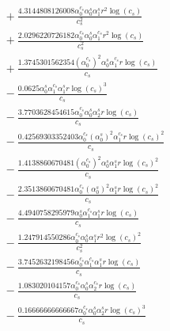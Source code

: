 \documentclass[10pt]{article}
\begin{document}
\begin{align*}
&{}  + \frac{4.3144808126008 \alpha_{0}^{c_s} \alpha_{0}^s \alpha_{1}^s r^{2} \log{\left(c_{s} \right)}}{c_{s}^{2}} \\
&{}  + \frac{2.0296220726182 \alpha_{0}^{c_s} \alpha_{0}^s \alpha_{1}^{c_s} r^{2} \log{\left(c_{s} \right)}}{c_{s}^{2}} \\
&{}  + \frac{1.3745301562354 \left(\alpha_{0}^{c_s}\right)^{2} \alpha_{0}^s \alpha_{1}^{c_s} r \log{\left(c_{s} \right)}}{c_{s}} \\
&{}  - \frac{0.0625 \alpha_{0}^s \alpha_{1}^{c_s} \alpha_{1}^s r \log{\left(c_{s} \right)}^{3}}{c_{s}} \\
&{}  - \frac{3.7703628454615 \alpha_{0}^{c_s} \alpha_{0}^s \alpha_{2}^s r \log{\left(c_{s} \right)}}{c_{s}} \\
&{}  - \frac{0.42569303352403 \alpha_{0}^{c_s} \left(\alpha_{0}^s\right)^{2} \alpha_{1}^{c_s} r \log{\left(c_{s} \right)}^{2}}{c_{s}} \\
&{}  - \frac{1.4138860670481 \left(\alpha_{0}^{c_s}\right)^{2} \alpha_{0}^s \alpha_{1}^s r \log{\left(c_{s} \right)}^{2}}{c_{s}} \\
&{}  - \frac{2.3513860670481 \alpha_{0}^{c_s} \left(\alpha_{0}^s\right)^{2} \alpha_{1}^s r \log{\left(c_{s} \right)}^{2}}{c_{s}} \\
&{}  - \frac{4.4940758295979 \alpha_{0}^s \alpha_{1}^{c_s} \alpha_{1}^s r \log{\left(c_{s} \right)}}{c_{s}} \\
&{}  - \frac{1.247914550286 \alpha_{0}^{c_s} \alpha_{0}^s \alpha_{1}^s r^{2} \log{\left(c_{s} \right)}^{2}}{c_{s}^{2}} \\
&{}  - \frac{3.7452632198456 \alpha_{0}^{c_s} \alpha_{1}^{c_s} \alpha_{1}^s r \log{\left(c_{s} \right)}}{c_{s}} \\
&{}  - \frac{1.083020104157 \alpha_{0}^{c_s} \alpha_{0}^s \alpha_{2}^{c_s} r \log{\left(c_{s} \right)}}{c_{s}} \\
&{}  - \frac{0.16666666666667 \alpha_{0}^{c_s} \alpha_{0}^s \alpha_{2}^s r \log{\left(c_{s} \right)}^{3}}{c_{s}}
\end{align*}
\end{document}
